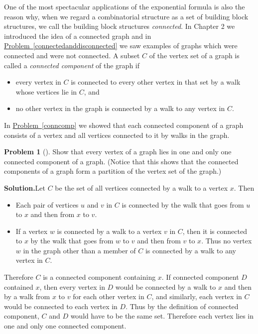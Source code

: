 \documentclass[10pt,]{book}
\theoremstyle{plain}
\theoremstyle{definition}
\newtheorem{activity}[project]{Problem}
\theoremstyle{definition}
\numberwithin{equation}{chapter}
\begin{document}
One of the most spectacular applications of the exponential formula is also the reason why, when we regard a combinatorial structure as a set of building block structures, we call the building block structures \emph{connected}. In Chapter 2 we introduced the idea of a connected graph and in \hyperref[connectedanddisconnected]{Problem~\ref{connectedanddisconnected}} we saw examples of graphs which were connected and were not connected. A subset \(C\) of the vertex set of a graph is called a \emph{connected component} of the graph if \leavevmode%
\begin{itemize}[label=\textbullet]
\item{}every vertex in \(C\) is connected to every other vertex in that set by a walk whose vertices lie in \(C\), and%
\item{}no other vertex in the graph is connected by a walk to any vertex in \(C\).%
\end{itemize}
%
\par
In \hyperref[conncomp]{Problem~\ref{conncomp}} we showed that each connected component of a graph consists of a vertex and all vertices connected to it by walks in the graph.%
\begin{activity}[]\label{activity-418}
Show that every vertex of a graph lies in one and only one connected component of a graph. (Notice that this shows that the connected components of a graph form a partition of the vertex set of the graph.)%
\par\medskip\noindent%
\textbf{Solution.}\quad Let \(C\) be the set of all vertices connected by a walk to a vertex \(x\). Then \leavevmode%
\begin{itemize}[label=\textbullet]
\item{}Each pair of vertices \(u\) and \(v\) in \(C\) is connected by the walk that goes from \(u\) to \(x\) and then from \(x\) to \(v\).%
\item{}If a vertex \(w\) is connected by a walk to a vertex \(v\) in \(C\), then it is connected to \(x\) by the walk that goes from \(w\) to \(v\) and then from \(v\) to \(x\).  Thus no  vertex \(w\) in the graph other than a member of \(C\) is connected by a walk to any vertex in \(C\).%
\end{itemize}
%
\par
Therefore \(C\) is a connected component containing \(x\). If connected component \(D\) contained \(x\), then every vertex in \(D\) would be connected by a walk to \(x\) and then by a walk from \(x\) to \(v\) for each other vertex in \(C\), and similarly, each vertex in \(C\) would be connected to each vertex in \(D\). Thus by the definition of connected component, \(C\) and \(D\) would have to be the same set. Therefore each vertex lies in one and only one connected component.%
\end{activity}
\end{document}
